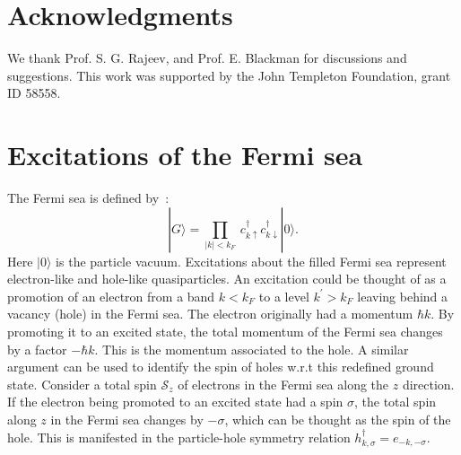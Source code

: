 \documentclass[10pt,letterpaper,aps,onecolumn,superscriptaddress,floatfix,notitlepage]{revtex4-1}
\begin{document}
	\section*{Acknowledgments}We thank Prof. S. G. Rajeev, and Prof. E. Blackman for discussions and suggestions.  This work was supported by the John Templeton Foundation, grant ID 58558.
	\appendix
	\section{Excitations of the Fermi sea\label{Ap:excitations}}
	The Fermi sea is defined by~\cite{mahan}:
	\begin{equation}
	|G\rangle = \prod_{|k|<k_{F}}~c_{k\uparrow}^{\dagger}c_{k\downarrow}^{\dagger}|0\rangle.\end{equation}
	Here $|0\rangle$ is the particle vacuum.
	Excitations about the filled Fermi sea represent electron-like and hole-like quasiparticles. An excitation could be thought of as a promotion of an electron from a band $k<k_{F}$ to a level $k^{'}>k_{F}$ leaving behind a vacancy (hole) in the Fermi sea. The electron originally had a momentum $\hbar k$. By promoting it to an excited state, the total momentum of the Fermi sea changes by a factor $-\hbar k$. This is the momentum associated to the hole. A similar argument can be used to identify the spin of holes w.r.t this redefined ground state. Consider a total spin $\mathcal{S}_{z}$ of electrons in the Fermi sea along the $z$ direction. If the electron being promoted to an excited state had a spin $\sigma$, the total spin along $z$ in the Fermi sea changes by $-\sigma$, which can be thought as the spin of the hole. This is manifested in the particle-hole symmetry relation $h^{\dagger}_{k,\sigma} = e_{-k,-\sigma}$. 
	
\end{document}
